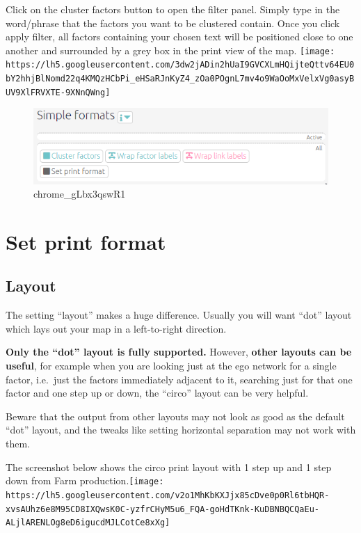 \documentclass[
]{book}
\begin{document}
Click on the cluster factors button to open the filter panel. Simply type in the word/phrase that the factors you want to be clustered contain. Once you click apply filter, all factors containing your chosen text will be positioned close to one another and surrounded by a grey box in the print view of the map. \texttt{[image: https://lh5.googleusercontent.com/3dw2jADin2hUaI9GVCXLmHQijteQttv64EU0bY2hhjBlNomd22q4KMQzHCbPi\_eHSaRJnKyZ4\_zOa0POgnL7mv4o9WaOoMxVelxVg0asyBUV9XlFRVXTE-9XNnQWng]}

\begin{figure}
\centering
\includegraphics[width=6.77083in,height=\textheight]{_assets/chrome_gLbx3qswR1.png}
\caption{chrome\_gLbx3qswR1}
\end{figure}

\hypertarget{set-print-format}{%
\section{Set print format}\label{set-print-format}}

\hypertarget{layout}{%
\subsection{Layout}\label{layout}}

The setting ``layout'' makes a huge difference. Usually you will want ``dot'' layout which lays out your map in a left-to-right direction.

\textbf{Only the ``dot'' layout is fully supported.} However, \textbf{other layouts can be useful}, for example when you are looking just at the ego network for a single factor, i.e.~just the factors immediately adjacent to it, searching just for that one factor and one step up or down, the ``circo'' layout can be very helpful.

Beware that the output from other layouts may not look as good as the default ``dot'' layout, and the tweaks like setting horizontal separation may not work with them.

The screenshot below shows the circo print layout with 1 step up and 1 step down from Farm production.\texttt{[image: https://lh5.googleusercontent.com/v2o1MhKbKXJjx85cDve0p0Rl6tbHQR-xvsAUhz6e8M95CD8IXQwsK0C-yzfrCHyM5u6\_FQA-goHdTKnk-KuDBNBQCQaEu-ALjlARENLOg8eD6igucdMJLCotCe8xXg]}
\end{document}
